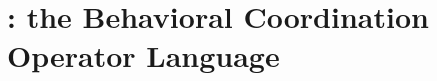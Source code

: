 \chapter{\bcool: the Behavioral Coordination Operator Language}
\label{ch:bcool}




















